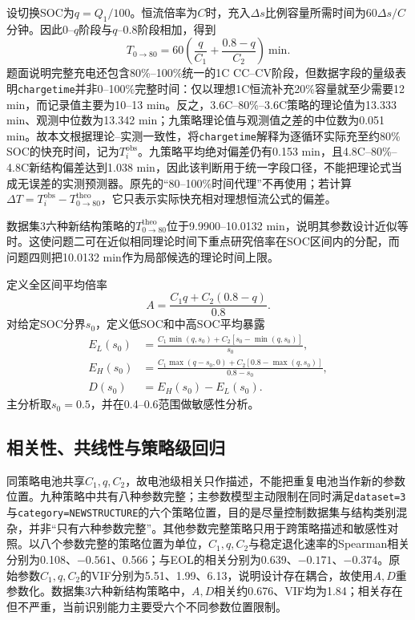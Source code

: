 \documentclass[withoutpreface]{cumcmthesis}
\begin{document}
设切换SOC为$q=Q_1/100$。恒流倍率为$C$时，充入$\Delta s$比例容量所需时间为$60\Delta s/C$分钟。因此0--$q$阶段与$q$--0.8阶段相加，得到
\begin{equation}
T_{0\rightarrow80}=60\left(\frac{q}{C_1}+\frac{0.8-q}{C_2}\right)\ \mathrm{min}.
\end{equation}
题面说明完整充电还包含80\%--100\%统一的1C CC--CV阶段，但数据字段的量级表明\texttt{chargetime}并非0--100\%完整时间：仅以理想1C恒流补充20\%容量就至少需要12 min，而记录值主要为10--13 min。反之，3.6C--80\%--3.6C策略的理论值为13.333 min、观测中位数为13.342 min；九策略理论值与观测值之差的中位数为0.051 min。故本文根据理论--实测一致性，将\texttt{chargetime}解释为逐循环实际充至约80\% SOC的快充时间，记为$T_i^{\mathrm{obs}}$。九策略平均绝对偏差仍有0.153 min，且4.8C--80\%--4.8C新结构偏差达到1.038 min，因此该判断用于统一字段口径，不能把理论式当成无误差的实测预测器。原先的“80--100\%时间代理”不再使用；若计算$\Delta T=T_i^{\mathrm{obs}}-T_{0\rightarrow80}^{\mathrm{theo}}$，它只表示实际快充相对理想恒流公式的偏差。

数据集3六种新结构策略的$T_{0\rightarrow80}^{\mathrm{theo}}$位于9.9900--10.0132 min，说明其参数设计近似等时。这使问题二可在近似相同理论时间下重点研究倍率在SOC区间内的分配，而问题四则把10.0132 min作为局部候选的理论时间上限。

定义全区间平均倍率
\begin{equation}
A=\frac{C_1q+C_2(0.8-q)}{0.8}.
\end{equation}
对给定SOC分界$s_0$，定义低SOC和中高SOC平均暴露
\begin{align}
E_L(s_0)&=\frac{C_1\min(q,s_0)+C_2[s_0-\min(q,s_0)]}{s_0},\\
E_H(s_0)&=\frac{C_1\max(q-s_0,0)+C_2[0.8-\max(q,s_0)]}{0.8-s_0},\\
D(s_0)&=E_H(s_0)-E_L(s_0).
\end{align}
主分析取$s_0=0.5$，并在0.4--0.6范围做敏感性分析。

\subsection{相关性、共线性与策略级回归}

同策略电池共享$C_1,q,C_2$，故电池级相关只作描述，不能把重复电池当作新的参数位置。九种策略中共有八种参数完整；主参数模型主动限制在同时满足\texttt{dataset=3}与\texttt{category=NEWSTRUCTURE}的六个策略位置，目的是尽量控制数据集与结构类别混杂，并非“只有六种参数完整”。其他参数完整策略只用于跨策略描述和敏感性对照。以八个参数完整的策略位置为单位，$C_1,q,C_2$与稳定退化速率的Spearman相关分别为0.108、$-0.561$、0.566；与EOL的相关分别为0.639、$-0.171$、$-0.374$。原始参数$C_1,q,C_2$的VIF分别为5.51、1.99、6.13，说明设计存在耦合，故使用$A,D$重参数化。数据集3六种新结构策略中，$A,D$相关约0.676、VIF均为1.84；相关存在但不严重，当前识别能力主要受六个不同参数位置限制。
\end{document}

